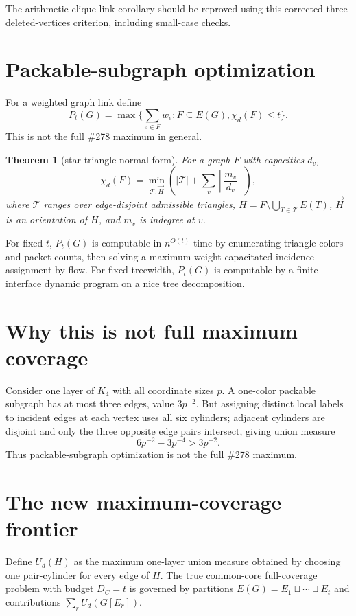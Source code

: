 \documentclass[11pt]{article}
\newtheorem{theorem}{Theorem}
\begin{document}
The arithmetic clique-link corollary should be reproved using this corrected three-deleted-vertices criterion, including small-case checks.

\section{Packable-subgraph optimization}
For a weighted graph link define
\[
P_t(G)=\max\{\sum_{e\in F}w_e:F\subseteq E(G),\chi_d(F)\le t\}.
\]
This is not the full \#278 maximum in general.

\begin{theorem}[star-triangle normal form]
For a graph $F$ with capacities $d_v$,
\[
\chi_d(F)=\min_{\mathcal T,\vec H}\left(|\mathcal T|+\sum_v\left\lceil\frac{m_v}{d_v}\right\rceil\right),
\]
where $\mathcal T$ ranges over edge-disjoint admissible triangles, $H=F\setminus\bigcup_{T\in\mathcal T}E(T)$, $\vec H$ is an orientation of $H$, and $m_v$ is indegree at $v$.
\end{theorem}

For fixed $t$, $P_t(G)$ is computable in $n^{O(t)}$ time by enumerating triangle colors and packet counts, then solving a maximum-weight capacitated incidence assignment by flow. For fixed treewidth, $P_t(G)$ is computable by a finite-interface dynamic program on a nice tree decomposition.

\section{Why this is not full maximum coverage}
Consider one layer of $K_4$ with all coordinate sizes $p$. A one-color packable subgraph has at most three edges, value $3p^{-2}$. But assigning distinct local labels to incident edges at each vertex uses all six cylinders; adjacent cylinders are disjoint and only the three opposite edge pairs intersect, giving union measure
\[
6p^{-2}-3p^{-4}>3p^{-2}.
\]
Thus packable-subgraph optimization is not the full \#278 maximum.

\section{The new maximum-coverage frontier}
Define $U_d(H)$ as the maximum one-layer union measure obtained by choosing one pair-cylinder for every edge of $H$. The true common-core full-coverage problem with budget $D_C=t$ is governed by partitions $E(G)=E_1\sqcup\cdots\sqcup E_t$ and contributions $\sum_r U_d(G[E_r])$.
\end{document}
